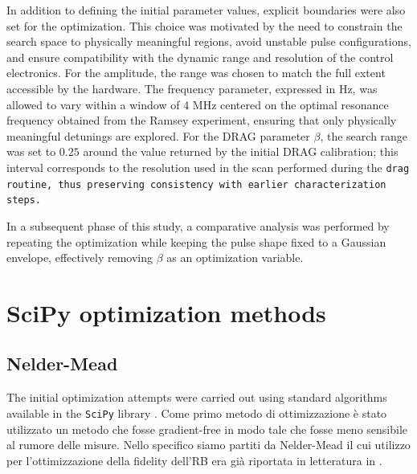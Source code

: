 In addition to defining the initial parameter values, explicit boundaries were also set for the optimization. 
This choice was motivated by the need to constrain the search space to physically meaningful regions, avoid unstable pulse configurations, and ensure compatibility with the dynamic range and resolution of the control electronics.
For the amplitude, the range was chosen to match the full extent accessible by the hardware. 
The frequency parameter, expressed in Hz, was allowed to vary within a window of 4 MHz centered on the optimal resonance frequency obtained from the Ramsey experiment, ensuring that only physically meaningful detunings are explored. 
For the DRAG parameter $\beta$, the search range was set to $0.25$ around the value returned by the initial DRAG calibration; this interval corresponds to the resolution used in the scan performed during the \tt{drag} routine, thus preserving consistency with earlier characterization steps.

In a subsequent phase of this study, a comparative analysis was performed by repeating the optimization while keeping the pulse shape fixed to a Gaussian envelope, effectively removing $\beta$ as an optimization variable. 

\section{SciPy optimization methods}\label{Sec:OptimizationMethods}

\subsection{Nelder-Mead}
The initial optimization attempts were carried out using standard algorithms available in the \texttt{SciPy} library \cite{SciPy-NMeth}.
Come primo metodo di ottimizzazione è stato utilizzato un metodo che fosse gradient-free in modo tale che fosse meno sensibile al rumore delle misure. 
Nello specifico siamo partiti da Nelder-Mead il cui utilizzo per l'ottimizzazione della fidelity dell'RB era già riportata in letteratura in \cite{kelly_optimal_2014}.

